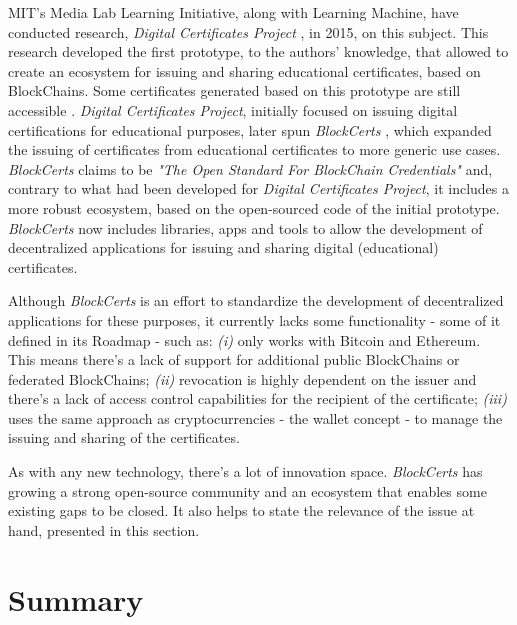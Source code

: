 MIT's Media Lab Learning Initiative, along with Learning Machine, have conducted research, \textit{Digital Certificates Project} \cite{MITCertificates}, in 2015, on this subject. This research developed the first prototype, to the authors' knowledge, that allowed to create an ecosystem for issuing and sharing educational certificates, based on BlockChains. Some certificates generated based on this prototype are still accessible \cite{MITCertificatesBootcamp}. \textit{Digital Certificates Project}, initially focused on issuing digital certifications for educational purposes, later spun \textit{BlockCerts} \cite{Blockcerts}, which expanded the issuing of certificates from educational certificates to more generic use cases. \textit{BlockCerts} claims to be \textit{"The Open Standard For BlockChain Credentials"} and, contrary to what had been developed for \textit{Digital Certificates Project}, it includes a more robust ecosystem, based on the open-sourced code of the initial prototype. \textit{BlockCerts} now includes libraries, apps and tools to allow the development of decentralized  applications for issuing and sharing digital (educational) certificates.

Although \textit{BlockCerts} is an effort to standardize the development of decentralized applications for these purposes, it currently lacks some functionality - some of it defined in its Roadmap - such as: \emph{(i)} only works with Bitcoin and Ethereum. This means there's a lack of support for additional public BlockChains or federated BlockChains; \emph{(ii)} revocation is highly dependent on the issuer and there's a lack of access control capabilities for the recipient of the certificate; \emph{(iii)} uses the same approach as cryptocurrencies - the wallet concept - to manage the issuing and sharing of the certificates.

As with any new technology, there's a lot of innovation space. \textit{BlockCerts} has growing a strong open-source community and an ecosystem that enables some existing gaps to be closed. It also helps to state the relevance of the issue at hand, presented in this section.

\section{Summary}

